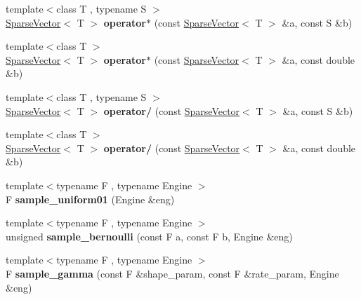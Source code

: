 \begin{DoxyCompactItemize}
{\footnotesize template$<$class T , typename S $>$ }\\\mbox{\hyperlink{classcpyp_1_1_sparse_vector}{Sparse\+Vector}}$<$ T $>$ {\bfseries operator$\ast$} (const \mbox{\hyperlink{classcpyp_1_1_sparse_vector}{Sparse\+Vector}}$<$ T $>$ \&a, const S \&b)
\item 
\mbox{\label{namespacecpyp_a7ad3c5a5830a9283e42247eafe50742b}} 
{\footnotesize template$<$class T $>$ }\\\mbox{\hyperlink{classcpyp_1_1_sparse_vector}{Sparse\+Vector}}$<$ T $>$ {\bfseries operator$\ast$} (const \mbox{\hyperlink{classcpyp_1_1_sparse_vector}{Sparse\+Vector}}$<$ T $>$ \&a, const double \&b)
\item 
\mbox{\label{namespacecpyp_aae6428c1c4a87b570a31513c1b971255}} 
{\footnotesize template$<$class T , typename S $>$ }\\\mbox{\hyperlink{classcpyp_1_1_sparse_vector}{Sparse\+Vector}}$<$ T $>$ {\bfseries operator/} (const \mbox{\hyperlink{classcpyp_1_1_sparse_vector}{Sparse\+Vector}}$<$ T $>$ \&a, const S \&b)
\item 
\mbox{\label{namespacecpyp_ae8b15c91542aa25a19ef4c139033a22b}} 
{\footnotesize template$<$class T $>$ }\\\mbox{\hyperlink{classcpyp_1_1_sparse_vector}{Sparse\+Vector}}$<$ T $>$ {\bfseries operator/} (const \mbox{\hyperlink{classcpyp_1_1_sparse_vector}{Sparse\+Vector}}$<$ T $>$ \&a, const double \&b)
\item 
\mbox{\label{namespacecpyp_a083dcb7c3b2f70e461cb8c21622b632a}} 
{\footnotesize template$<$typename F , typename Engine $>$ }\\F {\bfseries sample\+\_\+uniform01} (Engine \&eng)
\item 
\mbox{\label{namespacecpyp_abf714e87afb5ffcbf468a9dd1f20fc39}} 
{\footnotesize template$<$typename F , typename Engine $>$ }\\unsigned {\bfseries sample\+\_\+bernoulli} (const F a, const F b, Engine \&eng)
\item 
\mbox{\label{namespacecpyp_a0cf02ba9c9188bb2b2b2831cea4b86d3}} 
{\footnotesize template$<$typename F , typename Engine $>$ }\\F {\bfseries sample\+\_\+gamma} (const F \&shape\+\_\+param, const F \&rate\+\_\+param, Engine \&eng)

\end{DoxyCompactItemize}
